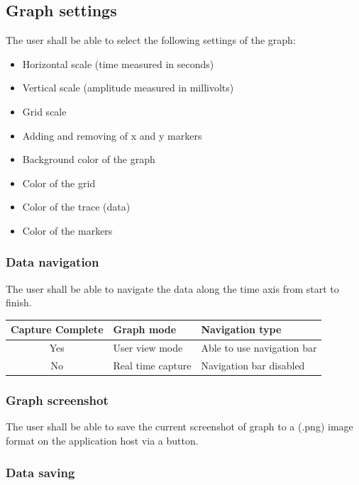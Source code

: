 \documentclass[12pt,a4paper]{article}
\begin{document}
\subsection{Graph settings}

The user shall be able to select the following settings of the graph:

\begin{itemize}
\item Horizontal scale (time measured in seconds)
\item Vertical scale (amplitude measured in millivolts)
\item Grid scale 
\item Adding and removing of x and y markers
\item Background color of the graph
\item Color of the grid
\item Color of the trace (data)
\item Color of the markers
\end{itemize}


\subsubsection{Data navigation}

The user shall be able to navigate the data along the time axis from start to finish.

\begin{table}[htbp]
	\centering
	\begin{tabular}{|c|l|l|}
		\hline
		\textbf{Capture Complete} & \textbf{Graph mode}  & \textbf{Navigation type} \\
		\hline
		Yes & User view mode & Able to use navigation bar\\
		\hline
		No & Real time capture & Navigation bar disabled \\
		\hline
	\end{tabular}
\end{table}


\subsubsection{Graph screenshot}

The user shall be able to save the current screenshot of graph to a (.png) image format on the application host via a button.

\subsubsection{Data saving}
\end{document}
